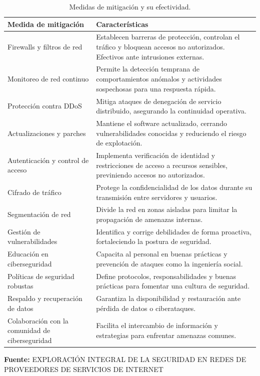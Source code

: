 \documentclass[a4paper, 10pt]{article}
\begin{document}
    \begin{table}[H]
        \centering
        \caption{Medidas de mitigación y su efectividad.}
        \begin{tabular}{p{4.5cm} p{10cm}}
        \toprule
        \textbf{Medida de mitigación} & \textbf{Características} \\
        \hline
        Firewalls y filtros de red & Establecen barreras de protección, controlan el tráfico y bloquean accesos no autorizados. Efectivos ante intrusiones externas. \\
        \bottomrule
        Monitoreo de red continuo & Permite la detección temprana de comportamientos anómalos y actividades sospechosas para una respuesta rápida. \\
        \bottomrule
        Protección contra DDoS & Mitiga ataques de denegación de servicio distribuido, asegurando la continuidad operativa. \\
        \bottomrule
        Actualizaciones y parches & Mantiene el software actualizado, cerrando vulnerabilidades conocidas y reduciendo el riesgo de explotación. \\
        \bottomrule
        Autenticación y control de acceso & Implementa verificación de identidad y restricciones de acceso a recursos sensibles, previniendo accesos no autorizados. \\
        \bottomrule
        Cifrado de tráfico & Protege la confidencialidad de los datos durante su transmisión entre servidores y usuarios. \\
        \bottomrule
        Segmentación de red & Divide la red en zonas aisladas para limitar la propagación de amenazas internas. \\
        \bottomrule
        Gestión de vulnerabilidades & Identifica y corrige debilidades de forma proactiva, fortaleciendo la postura de seguridad. \\
        \bottomrule
        Educación en ciberseguridad & Capacita al personal en buenas prácticas y prevención de ataques como la ingeniería social. \\
        \bottomrule
        Políticas de seguridad robustas & Define protocolos, responsabilidades y buenas prácticas para fomentar una cultura de seguridad. \\
        \bottomrule
        Respaldo y recuperación de datos & Garantiza la disponibilidad y restauración ante pérdida de datos o ciberataques. \\
        \bottomrule
        Colaboración con la comunidad de ciberseguridad & Facilita el intercambio de información y estrategias para enfrentar amenazas comunes. \\
        \bottomrule
        \end{tabular}
        \vspace{0.5em}
        \begin{flushleft}
        \footnotesize \textbf{Fuente:} EXPLORACIÓN INTEGRAL DE LA SEGURIDAD EN REDES DE PROVEEDORES DE SERVICIOS DE INTERNET \cite{mitigacion}
        \end{flushleft}
        \label{tab:medidas_mitigacion}
        \end{table}
        
\end{document}
